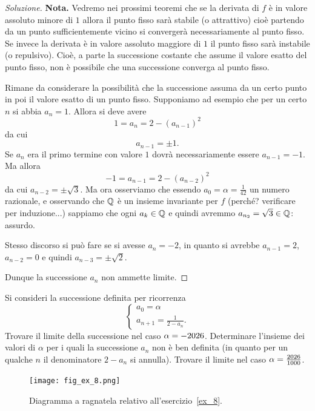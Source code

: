 \begin{proof}[Soluzione]
  \textbf{Nota.} Vedremo nei prossimi teoremi che
  se la derivata di $f$ è in valore assoluto minore di
  $1$ allora il punto fisso sarà stabile (o attrattivo) cioè partendo
  da un punto sufficientemente vicino si convergerà necessariamente al
  punto fisso. Se invece la derivata è in valore assoluto maggiore di
  $1$ il punto fisso sarà instabile (o repulsivo). Cioè, a parte la
  successione costante che assume il valore esatto del punto fisso,
  non è
  possibile che una successione converga al punto fisso.

  Rimane da considerare la possibilità che la successione assuma da un
  certo punto in poi il valore esatto di un punto fisso. Supponiamo ad
  esempio che per un certo $n$ si abbia $a_n=1$. Allora si deve avere
  \[
  1 = a_n = 2-(a_{n-1})^2
  \]
  da cui
  \[
  a_{n-1} = \pm 1.
  \]
  Se $a_n$ era il primo termine con valore $1$ dovrà necessariamente
  essere $a_{n-1} = -1$. Ma allora
  \[
  -1 = a_{n-1} = 2-(a_{n-2})^2
  \]
  da cui $a_{n-2} = \pm \sqrt 3$. Ma ora osserviamo che essendo $a_0=
  \alpha = \frac 1 {42}$ un numero razionale, e osservando che $\mathbb Q$ è un
  insieme invariante per $f$ (perché? verificare per induzione...)
  sappiamo che ogni $a_k \in \mathbb Q$ e quindi
  avremmo $a_{n_2} = \sqrt 3 \in \mathbb Q$: assurdo.

  Stesso discorso si può fare se si avesse $a_n=-2$, in quanto si
  avrebbe $a_{n-1} = 2$, $a_{n-2} = 0$ e quindi $a_{n-3}=\pm \sqrt 2$.

  Dunque la successione $a_n$ non ammette limite.
\end{proof}

\begin{exercise}\label{ex_8}
  Si consideri la successione definita per ricorrenza
  \[
  \begin{cases}
    a_0 = \alpha\\
    a_{n+1} = \frac{1}{2-a_n}.
  \end{cases}
  \]
  Trovare il limite della successione nel caso $\alpha =
  -\the\year$. Determinare l'insieme dei valori di $\alpha$ per i quali la
  successione $a_n$ non è ben definita (in quanto per un qualche $n$ il
  denominatore $2-a_n$ si annulla).
  Trovare il limite nel caso $\alpha=\frac{\the\year}{1000}$.
\end{exercise}

\begin{figure}
 \begin{center}
    \texttt{[image: fig\_ex\_8.png]}
  \end{center}
  \caption{Diagramma a ragnatela relativo
    all'esercizio~\ref{ex_8}.}
  \label{fig_ex_8}
\end{figure}

